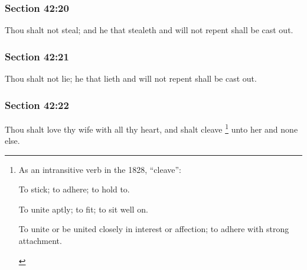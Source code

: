 	\subsubsection{Section 42:20} %
		\label{DC42-20}

		Thou shalt not steal; and he that stealeth and will not repent shall be cast out.


	\subsubsection{Section 42:21} %
		\label{DC42-21}

		Thou shalt not lie; he that lieth and will not repent shall be cast out.


	\subsubsection{Section 42:22} %
		\label{DC42-22}

		Thou shalt love thy wife with all thy heart, and shalt cleave%
			\footnote{%
				As an intransitive verb in the 1828, ``cleave'':
					\begin{compactitem}
						\item[1] To stick; to adhere; to hold to.
						\item[2] To unite aptly; to fit; to sit well on.
						\item[3] To unite or be united closely in interest or affection; to adhere with strong attachment.
					\end{compactitem}
				}
		unto her and none else.

